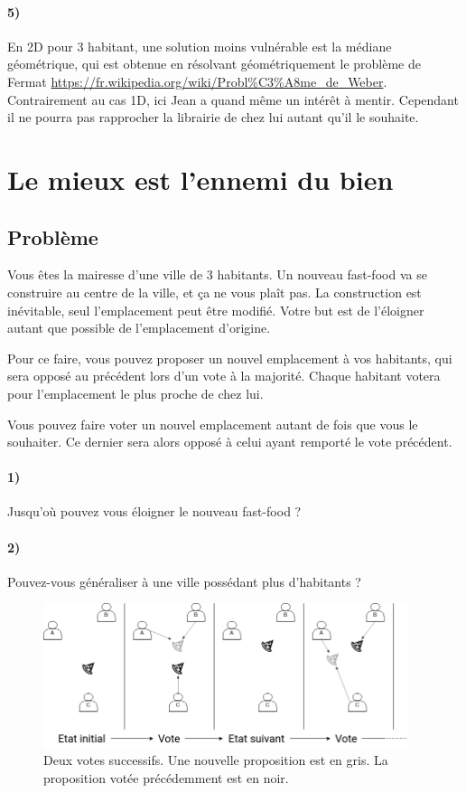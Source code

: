 \documentclass[a4paper,10pt,oneside]{article}
\begin{document}
\paragraph*{5)} 
En 2D pour 3 habitant, une solution moins vulnérable est la médiane géométrique, qui est obtenue en résolvant géométriquement le problème de Fermat \url{https://fr.wikipedia.org/wiki/Probl%C3%A8me_de_Weber}.
Contrairement au cas 1D, ici Jean a quand même un intérêt à mentir.
Cependant il ne pourra pas rapprocher la librairie de chez lui autant qu'il le souhaite.


\section{Le mieux est l'ennemi du bien}

\subsection{Problème}

Vous êtes la mairesse d'une ville de 3 habitants.
Un nouveau fast-food va se construire au centre de la ville, et ça ne vous plaît pas.
La construction est inévitable, seul l'emplacement peut être modifié.
Votre but est de l'éloigner autant que possible de l'emplacement d'origine.

Pour ce faire, vous pouvez proposer un nouvel emplacement à vos habitants, qui sera opposé au précédent lors d'un vote à la majorité.
Chaque habitant votera pour l'emplacement le plus proche de chez lui.

Vous pouvez faire voter un nouvel emplacement autant de fois que vous le souhaiter.
Ce dernier sera alors opposé à celui ayant remporté le vote précédent.


\paragraph*{1)} 
Jusqu'où pouvez vous éloigner le nouveau fast-food ?

\paragraph*{2)} 
Pouvez-vous généraliser à une ville possédant plus d'habitants ?


\begin{figure}[!h]
  \centering
  \includegraphics*[width=0.95\textwidth]{figures/democracy.png}
  \caption{Deux votes successifs. Une nouvelle proposition est en gris. La proposition votée précédemment est en noir.}
\end{figure}
\end{document}
